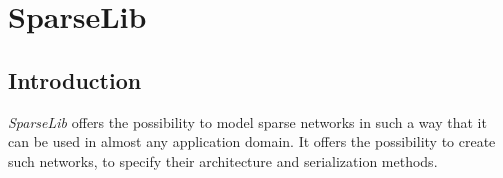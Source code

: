 \section{SparseLib}
\subsection{Introduction}
{\it SparseLib} offers the possibility to model sparse networks in such a way that it can be used in almost any application 
domain. It offers the possibility to create such networks, to specify their architecture and serialization methods. 
